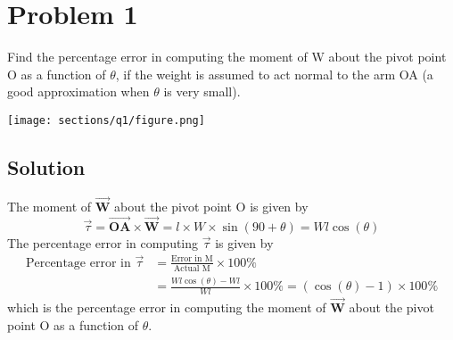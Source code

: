 \section*{Problem 1}

Find the percentage error in computing the moment of W about the pivot point O as a function of \( \theta \), if the weight is assumed to act normal to the arm OA (a good approximation when \( \theta \) is very small).

\begin{figure*}[h]
    \centering
    \texttt{[image: sections/q1/figure.png]}
\end{figure*}

\subsection*{Solution}

The moment of \( \vec{\mathbf{W}} \) about the pivot point O is given by
\[
    \vec{\tau} = \vec{\mathbf{OA}} \times \vec{\mathbf{W}}
    = l \times W \times \sin(90 + \theta)
    = W l \cos(\theta)
\]
The percentage error in computing \( \vec{\tau} \) is given by
\begin{align*}
    \text{Percentage error in } \vec{\tau}
     & =
    \frac{\text{Error in M}}{\text{Actual M}} \times 100\% \\
     & = \frac{W l \cos(\theta) - W l}{W l} \times 100\%
    = (\cos(\theta) - 1) \times 100\%
\end{align*}
which is the percentage error in computing the moment of \( \vec{\mathbf{W}} \) about the pivot point O as a function of \( \theta \).
